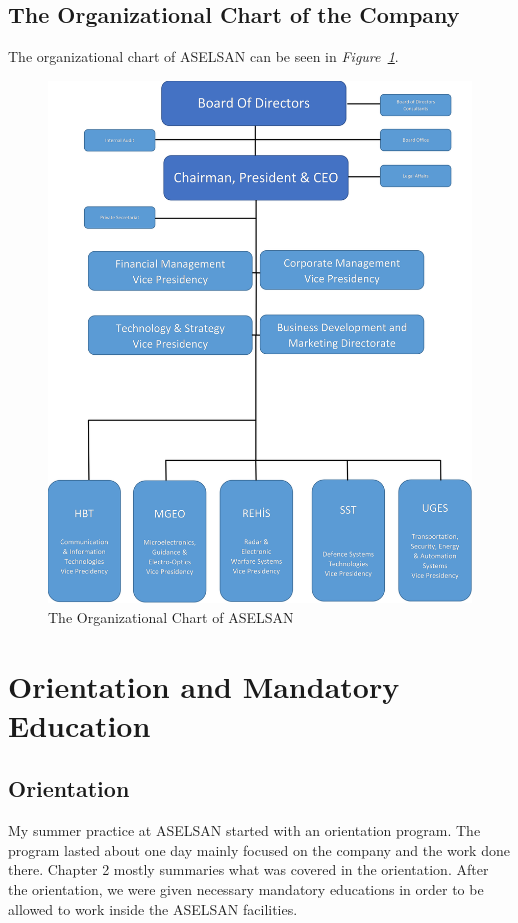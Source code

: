 \vfill 

\subsection{The Organizational Chart of the Company}
\-
\indent
The organizational chart of ASELSAN can be seen in \textit{Figure~\ref{fig:orgc}}.

\begin{figure}[H]
\center
\setlength{\unitlength}{\textwidth} 
\includegraphics[width=0.9\unitlength]{organizasyon4}
\caption{\label{fig:orgc}The Organizational Chart of ASELSAN }
\end{figure}

	
	
\vfill

\section{Orientation and Mandatory Education}

\subsection{Orientation}
\- \indent
	My summer practice at ASELSAN started with an orientation program. The program lasted about one day mainly focused on the company and the work done there. Chapter 2 mostly summaries what was covered in the orientation. After the orientation, we were given necessary mandatory educations in order to be allowed to work inside the ASELSAN facilities.  

